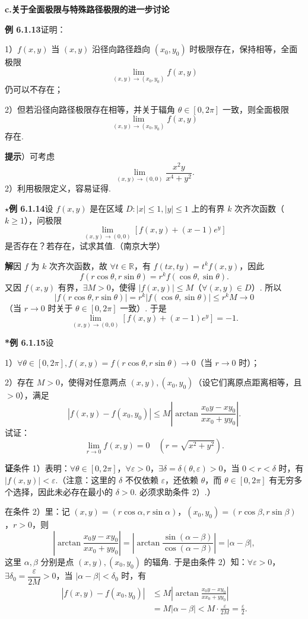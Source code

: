 \documentclass[UTF8,12pt,a4paper,fontset=fandol]{ctexart}
\begin{document}
\noindent\textbf{c.\quad 关于全面极限与特殊路径极限的进一步讨论}

\noindent\textbf{例 6.1.13}\quad 证明：

1）$f(x,y)$ 当 $(x,y)$ 沿径向路径趋向 $(x_0,y_0)$ 时极限存在，保持相等，全面极限
\[
  \lim_{(x,y)\to(x_0,y_0)}f(x,y)
\]
仍可以不存在；

2）但若沿径向路径极限存在相等，并关于辐角 $\theta\in[0,2\pi]$ 一致，则全面极限
\[
  \lim_{(x,y)\to(x_0,y_0)}f(x,y)
\]
存在.

\noindent\textbf{提示}）可考虑
\[
  \lim_{(x,y)\to(0,0)}\frac{x^2y}{x^4+y^2}.
\]
2）利用极限定义，容易证得.

\noindent\textbf{$\star$例 6.1.14}\quad 设 $f(x,y)$ 是在区域 $D:|x|\le1,|y|\le1$ 上的有界 $k$ 次齐次函数（$k\ge1$），问极限
\[
  \lim_{(x,y)\to(0,0)}[f(x,y)+(x-1)e^y]
\]
是否存在？若存在，试求其值.（南京大学）

\noindent\textbf{解}\quad 因 $f$ 为 $k$ 次齐次函数，故 $\forall t\in\mathbb{R}$，有 $f(tx,ty)=t^kf(x,y)$，因此
\[
  f(r\cos\theta,r\sin\theta)=r^kf(\cos\theta,\sin\theta).
\]
又因 $f(x,y)$ 有界，$\exists M>0$，使得 $|f(x,y)|\le M$（$\forall(x,y)\in D$）. 所以
\[
  |f(r\cos\theta,r\sin\theta)|
  =r^k|f(\cos\theta,\sin\theta)|
  \le r^kM\to0
\]
（当 $r\to0$ 时关于 $\theta\in[0,2\pi]$ 一致）.
于是
\[
  \lim_{(x,y)\to(0,0)}[f(x,y)+(x-1)e^y]=-1.
\]

\noindent\textbf{*例 6.1.15}\quad 设

1）$\forall\theta\in[0,2\pi],f(x,y)=f(r\cos\theta,r\sin\theta)\to0$（当 $r\to0$ 时）；

2）存在 $M>0$，使得对任意两点 $(x,y),(x_0,y_0)$（设它们离原点距离相等，且 $>0$），满足
\[
  |f(x,y)-f(x_0,y_0)|
  \le M\left|\arctan\frac{x_0y-xy_0}{xx_0+yy_0}\right|.
\]
试证：
\[
  \lim_{r\to0}f(x,y)=0\quad (r=\sqrt{x^2+y^2}).
\]

\noindent\textbf{证}\quad 条件 1）表明：$\forall\theta\in[0,2\pi]$，$\forall\varepsilon>0$，$\exists\delta=\delta(\theta,\varepsilon)>0$，当 $0<r<\delta$ 时，有 $|f(x,y)|<\varepsilon$.（注意：这里的 $\delta$ 不仅依赖 $\varepsilon$，还依赖 $\theta$，而 $\theta\in[0,2\pi]$ 有无穷多个选择，因此未必存在最小的 $\delta>0$. 必须求助条件 2）.）

在条件 2）里：记 $(x,y)=(r\cos\alpha,r\sin\alpha)$，$(x_0,y_0)=(r\cos\beta,r\sin\beta)$，$r>0$，则
\[
  \left|\arctan\frac{x_0y-xy_0}{xx_0+yy_0}\right|
  =\left|\arctan\frac{\sin(\alpha-\beta)}{\cos(\alpha-\beta)}\right|
  =|\alpha-\beta|,
\]
这里 $\alpha,\beta$ 分别是点 $(x,y),(x_0,y_0)$ 的辐角. 于是由条件 2）知：$\forall\varepsilon>0$，$\exists\delta_0=\dfrac{\varepsilon}{2M}>0$，当 $|\alpha-\beta|<\delta_0$ 时，有
\[
\begin{aligned}
|f(x,y)-f(x_0,y_0)|
&\le M\left|\arctan\frac{x_0y-xy_0}{xx_0+yy_0}\right|\\
&=M|\alpha-\beta|<M\cdot\frac{\varepsilon}{2M}=\frac{\varepsilon}{2}.
\end{aligned}
\tag{1}
\]
\end{document}

